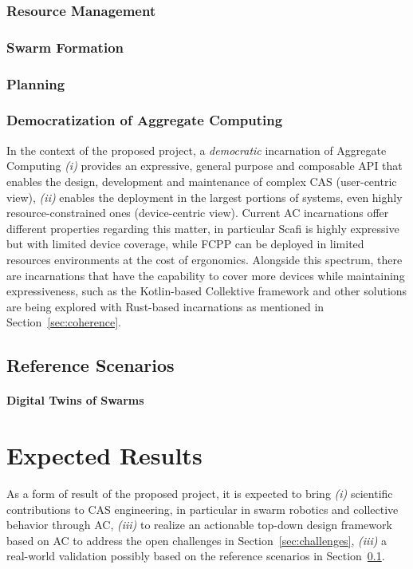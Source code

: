 \documentclass[12pt]{article}
\begin{document}
\subsubsection{Resource Management}

\subsubsection{Swarm Formation}

\subsubsection{Planning}

\subsubsection{Democratization of Aggregate Computing}
In the context of the proposed project, a \textit{democratic} incarnation of Aggregate Computing \textit{(i)} provides an expressive, general purpose and
composable API that enables the design, development and maintenance of complex CAS (user-centric view), \textit{(ii)} enables the deployment
in the largest portions of systems, even highly resource-constrained ones (device-centric view). Current AC incarnations offer different properties
regarding this matter, in particular Scafi is highly expressive but with limited device coverage, while FCPP can be deployed in limited resources environments
at the cost of ergonomics. Alongside this spectrum, there are incarnations that have the capability to cover more devices while maintaining expressiveness, such as the Kotlin-based
Collektive framework and other solutions are being explored with Rust-based incarnations as mentioned in Section~\ref{sec:coherence}.

\subsection{Reference Scenarios}
\label{sec:scenarios}

\paragraph{Digital Twins of Swarms}

\section{Expected Results}
As a form of result of the proposed project, it is expected to bring \textit{(i)} scientific contributions to CAS engineering, in particular in swarm robotics and collective behavior through AC,
\textit{(iii)} to realize an actionable top-down design framework based on AC to address the open challenges in Section~\ref{sec:challenges}, \textit{(iii)} a real-world validation possibly based on the reference scenarios in Section~\ref{sec:scenarios}.
\end{document}
